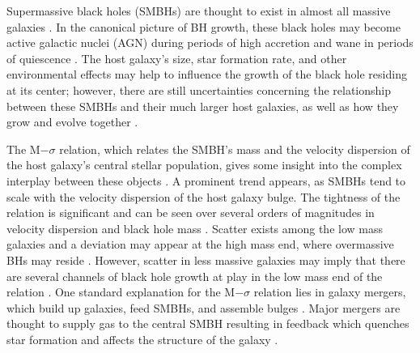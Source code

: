 \documentclass[]{emulateapj}
\begin{document}
Supermassive black holes (SMBHs) are thought to exist in almost all massive galaxies \citep[see][for a review]{Kormendy2013}. In the canonical picture of BH growth, these black holes may become active galactic nuclei (AGN) during periods of high accretion and wane in periods of quiescence \citep{Begelman1980,Alexander2005,Papovich2006,Volonteri2012}. The host galaxy's size, star formation rate, and other environmental effects may help to influence the growth of the black hole residing at its center; however, there are still uncertainties concerning the relationship between these SMBHs and their much larger host galaxies, as well as how they grow and evolve together \citep{Haehnelt2000,DiMatteo2005,Hopkins2006,Fu2008,Sijacki2009,Silverman2009,Micic2011,Mullaney2012}.

The M$-\sigma$ relation, which relates the SMBH's mass and the velocity dispersion of the host galaxy's central stellar population, gives some insight into the complex interplay between these objects \citep{Ferrarese2000,Gebhardt2000}. A prominent trend appears, as SMBHs tend to scale with the velocity dispersion of the host galaxy bulge. The tightness of the relation is significant and can be seen over several orders of magnitudes in velocity dispersion and black hole mass \citep[e.g.][]{Merritt2001,Tremaine2002,Graham2011,Mcconnell2013}. Scatter exists among the low mass galaxies and a deviation may appear at the high mass end, where overmassive BHs may reside \citep{VanDenBosch2007,Moster2010,Natarajan2011,Emsellem2011,Dubois2015}. However, scatter in less massive galaxies may imply that there are several channels of black hole growth at play in the low mass end of the relation \citep{Micic2007,Volonteri2009,Reines2013,Graham2014}. One standard explanation for the M$-\sigma$ relation lies in galaxy mergers, which build up galaxies, feed SMBHs, and assemble bulges \citep[e.g.][]{DiMatteo2005,Shen2008}. Major mergers are thought to supply gas to the central SMBH resulting in feedback which quenches star formation and affects the structure of the galaxy \citep{Schawinski2010}. 


\end{document}
